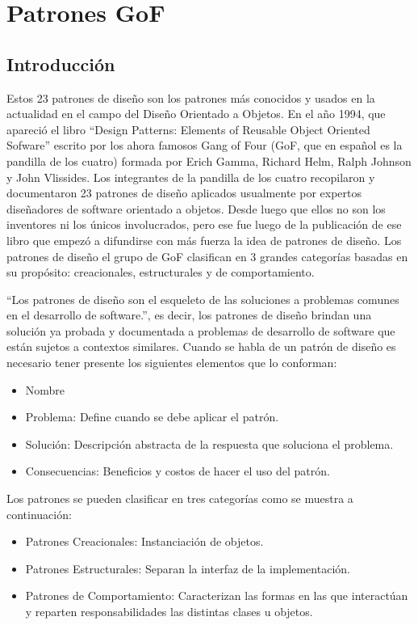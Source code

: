\chapter{Patrones GoF}

\section{Introducción}

Estos 23 patrones de diseño son los patrones más conocidos y usados en la actualidad en el campo del Diseño Orientado a Objetos. \newline
En el año 1994, que apareció el libro “Design Patterns: Elements of Reusable Object Oriented Sofware” escrito por los ahora famosos Gang of Four (GoF, que en español es la pandilla de los cuatro) formada por Erich Gamma, Richard Helm, Ralph Johnson y John Vlissides. Los integrantes de la pandilla de los cuatro recopilaron y documentaron 23 patrones de diseño aplicados usualmente por expertos diseñadores de software orientado a objetos. Desde luego que ellos no son los inventores ni los únicos involucrados, pero ese fue luego de la publicación de ese libro que empezó a difundirse con más fuerza la idea de patrones de diseño. \newline
Los patrones de diseño el grupo de GoF clasifican en 3 grandes categorías basadas en su propósito: creacionales, estructurales y de comportamiento. \cite{gof}

“Los patrones de diseño son el esqueleto de las soluciones a problemas comunes en el desarrollo de software.”, es decir,  los patrones de diseño brindan una solución ya probada y documentada a problemas de desarrollo de software que están sujetos a contextos similares. 
Cuando se habla de un patrón de diseño es necesario tener presente los siguientes elementos que lo conforman: 
\begin{itemize}
	\item Nombre
	\item Problema: Define cuando se debe aplicar el patrón.
	\item Solución: Descripción abstracta de la respuesta que soluciona el problema.
	\item Consecuencias: Beneficios y costos de hacer el uso del patrón.
\end{itemize}  


Los patrones se pueden clasificar en tres categorías como se muestra a continuación:

\begin{itemize}
	\item Patrones Creacionales: Instanciación de objetos.
	\item Patrones Estructurales: Separan la interfaz de la implementación.
	\item Patrones de Comportamiento: Caracterizan las formas en  	las que interactúan y reparten responsabilidades las distintas clases u objetos.
\end{itemize}
\newpage




